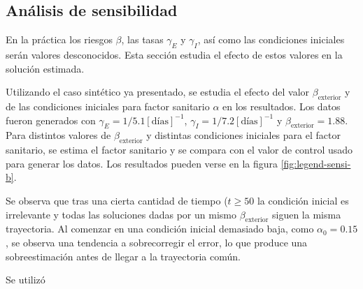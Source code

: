 \subsection{Análisis de sensibilidad}


En la práctica los riesgos \(\beta \), las tasas \(\gamma_E\) y \(\gamma_I\), así como las condiciones iniciales serán valores desconocidos. Esta sección estudia el efecto de estos valores en la solución estimada. 

Utilizando el caso sintético ya presentado, se estudia el efecto del valor \(\beta_{\text{exterior}}\) y de las condiciones iniciales para factor sanitario \(\alpha\) en los resultados. Los datos fueron generados con \(\gamma_E = 1/5.1 [\text{días}]^{-1}\), \(\gamma_I = 1/7.2 [\text{días}]^{-1}\) y \(\beta_{\text{exterior}} = 1.88\). Para distintos valores de \(\beta_{\text{exterior}}\) y distintas condiciones iniciales para el factor sanitario, se estima el factor sanitario y se compara con el valor de control usado para generar los datos. Los resultados pueden verse en la figura \ref{fig:legend-sensi-b}.

Se observa que tras una cierta cantidad de tiempo (\(t \geq 50\) la condición inicial es irrelevante y todas las soluciones dadas por un mismo \(\beta_{\text{exterior}}\) siguen la misma trayectoria. Al comenzar en una condición inicial demasiado baja, como \(\alpha_0 = 0.15\), se observa una tendencia a sobrecorregir el error, lo que produce una sobreestimación antes de llegar a la trayectoria común.

Se utilizó 


